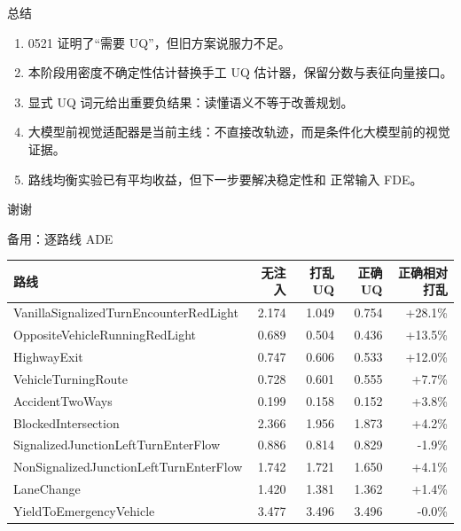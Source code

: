 \documentclass[aspectratio=169, 11pt]{ctexbeamer}
\begin{document}
\begin{frame}{总结}
\large
\begin{enumerate}
    \item 0521 证明了“需要 UQ”，但旧方案说服力不足。
    \item 本阶段用密度不确定性估计替换手工 UQ 估计器，保留分数与表征向量接口。
    \item 显式 UQ 词元给出重要负结果：读懂语义不等于改善规划。
    \item 大模型前视觉适配器是当前主线：不直接改轨迹，而是条件化大模型前的视觉证据。
    \item 路线均衡实验已有平均收益，但下一步要解决稳定性和 正常输入 FDE。
\end{enumerate}
\end{frame}

\begin{frame}[standout]
谢谢
\end{frame}

\appendix

\begin{frame}{备用：逐路线 ADE}
\tiny
\begin{tabular}{p{6.6cm}rrrr}
\toprule
\textbf{路线} & \textbf{无注入} & \textbf{打乱 UQ} & \textbf{正确 UQ} & \textbf{正确相对打乱} \\
\midrule
VanillaSignalizedTurnEncounterRedLight & 2.174 & 1.049 & 0.754 & +28.1\% \\
OppositeVehicleRunningRedLight & 0.689 & 0.504 & 0.436 & +13.5\% \\
HighwayExit & 0.747 & 0.606 & 0.533 & +12.0\% \\
VehicleTurningRoute & 0.728 & 0.601 & 0.555 & +7.7\% \\
AccidentTwoWays & 0.199 & 0.158 & 0.152 & +3.8\% \\
BlockedIntersection & 2.366 & 1.956 & 1.873 & +4.2\% \\
SignalizedJunctionLeftTurnEnterFlow & 0.886 & 0.814 & 0.829 & -1.9\% \\
NonSignalizedJunctionLeftTurnEnterFlow & 1.742 & 1.721 & 1.650 & +4.1\% \\
LaneChange & 1.420 & 1.381 & 1.362 & +1.4\% \\
YieldToEmergencyVehicle & 3.477 & 3.496 & 3.496 & -0.0\% \\
\bottomrule
\end{tabular}
\end{frame}
\end{document}
